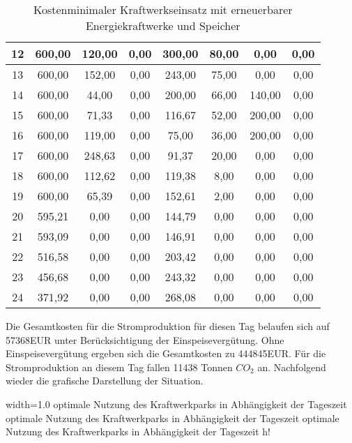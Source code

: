 \documentclass{eegreport}
\begin{document}
\begin{table}[h]
\begin{center}
\begin{tabular}{|c|c|c|c|c|c|c|c|}
\hline 
12     & 600,00 & 120,00 & 0,00       & 300,00 & 80,00 & 0,00        & 0,00    \\
\hline 
13     & 600,00 & 152,00 & 0,00       & 243,00 & 75,00 & 0,00        & 0,00    \\
\hline 
14     & 600,00 & 44,00  & 0,00       & 200,00 & 66,00 & 140,00      & 0,00    \\
\hline 
15     & 600,00 & 71,33  & 0,00       & 116,67 & 52,00 & 200,00      & 0,00    \\
\hline 
16     & 600,00 & 119,00 & 0,00       & 75,00  & 36,00 & 200,00      & 0,00    \\
\hline 
17     & 600,00 & 248,63 & 0,00       & 91,37  & 20,00 & 0,00        & 0,00    \\
\hline 
18     & 600,00 & 112,62 & 0,00       & 119,38 & 8,00  & 0,00        & 0,00    \\
\hline 
19     & 600,00 & 65,39  & 0,00       & 152,61 & 2,00  & 0,00        & 0,00    \\
\hline 
20     & 595,21 & 0,00   & 0,00       & 144,79 & 0,00  & 0,00        & 0,00    \\
\hline 
21     & 593,09 & 0,00   & 0,00       & 146,91 & 0,00  & 0,00        & 0,00    \\
\hline 
22     & 516,58 & 0,00   & 0,00       & 203,42 & 0,00  & 0,00        & 0,00    \\
\hline 
23     & 456,68 & 0,00   & 0,00       & 243,32 & 0,00  & 0,00        & 0,00    \\
\hline 
24     & 371,92 & 0,00   & 0,00       & 268,08 & 0,00  & 0,00        & 0,00   \\
\hline 
\end{tabular}
\end{center}
\caption{Kostenminimaler Kraftwerkseinsatz mit erneuerbarer Energiekraftwerke und Speicher}
\label{ac}
\end{table}

Die Gesamtkosten für die Stromproduktion für diesen Tag belaufen sich auf 57368EUR unter Berücksichtigung der Einspeisevergütung. 
Ohne Einspeisevergütung ergeben sich die Gesamtkosten zu 444845EUR.
Für die Stromproduktion an diesem Tag fallen 11438 Tonnen $CO_2$ an. 
Nachfolgend wieder die grafische Darstellung der Situation.

       {width=1.0\textwidth}
       {optimale Nutzung des Kraftwerkparks in Abhängigkeit der Tageszeit}
       {optimale Nutzung des Kraftwerkparks in Abhängigkeit der Tageszeit}
       {optimale Nutzung des Kraftwerkparks in Abhängigkeit der Tageszeit}
       {h!} 
\end{document}
